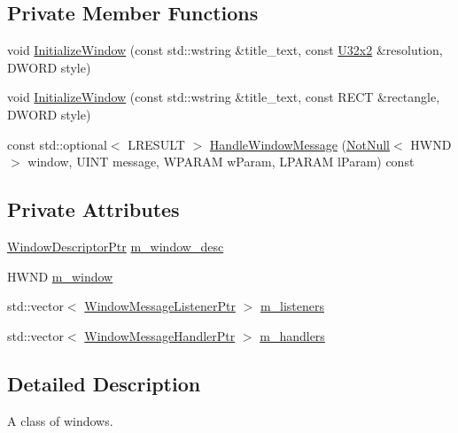 \subsection*{Private Member Functions}
\begin{DoxyCompactItemize}
\item 
void \mbox{\hyperlink{classmage_1_1_window_a3fa47fdd0b2ee0595a603c8c99715822}{Initialize\+Window}} (const std\+::wstring \&title\+\_\+text, const \mbox{\hyperlink{namespacemage_a31f2bb52b5080e706e1c13de07c0a249}{U32x2}} \&resolution, D\+W\+O\+RD style)
\item 
void \mbox{\hyperlink{classmage_1_1_window_a654881a55f0cbc5f0b12675be63488dd}{Initialize\+Window}} (const std\+::wstring \&title\+\_\+text, const R\+E\+CT \&rectangle, D\+W\+O\+RD style)
\item 
const std\+::optional$<$ L\+R\+E\+S\+U\+LT $>$ \mbox{\hyperlink{classmage_1_1_window_a1e79c3ae443ee043c85dad52c37caf78}{Handle\+Window\+Message}} (\mbox{\hyperlink{namespacemage_a8769f9d670d6b585ea306cb1062af94b}{Not\+Null}}$<$ H\+W\+ND $>$ window, U\+I\+NT message, W\+P\+A\+R\+AM w\+Param, L\+P\+A\+R\+AM l\+Param) const
\end{DoxyCompactItemize}
\subsection*{Private Attributes}
\begin{DoxyCompactItemize}
\item 
\mbox{\hyperlink{classmage_1_1_window_ac41b052d8e8dd0571b3ec862e8f6da05}{Window\+Descriptor\+Ptr}} \mbox{\hyperlink{classmage_1_1_window_a51bbea46f4590a68d384d0b8d14e0cd8}{m\+\_\+window\+\_\+desc}}
\item 
H\+W\+ND \mbox{\hyperlink{classmage_1_1_window_a5ca72a18801ff9e6abc309949d7b08b4}{m\+\_\+window}}
\item 
std\+::vector$<$ \mbox{\hyperlink{classmage_1_1_window_a0e0a4f2a3f6db176f6aec454b94a06fb}{Window\+Message\+Listener\+Ptr}} $>$ \mbox{\hyperlink{classmage_1_1_window_a28aab68439dc39058a7e507b0cd8c60b}{m\+\_\+listeners}}
\item 
std\+::vector$<$ \mbox{\hyperlink{classmage_1_1_window_add1d792fb9f71e70d4fb07409d80cfdd}{Window\+Message\+Handler\+Ptr}} $>$ \mbox{\hyperlink{classmage_1_1_window_a7438964a7b8c196d84da24cf789e5bd9}{m\+\_\+handlers}}
\end{DoxyCompactItemize}


\subsection{Detailed Description}
A class of windows. 

